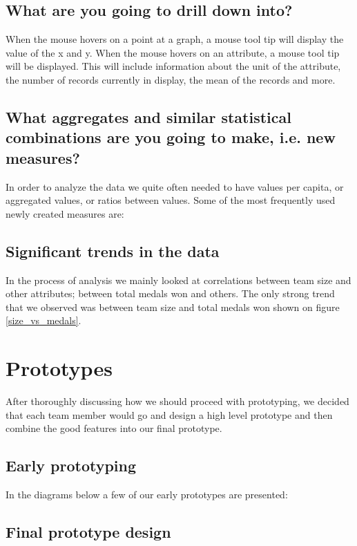 \documentclass[a4paper]{article}
\begin{document}
\subsection{What are you going to drill down into?}

When the mouse hovers on a point at a graph, a mouse tool tip will display the value of the x and y. When the mouse hovers on an attribute, a mouse tool tip will be displayed. This will include information about the unit of the attribute, the number of records currently in display, the mean of the records and more.

\subsection{What aggregates and similar statistical combinations are you going to make, i.e. new measures?}

In order to analyze the data we quite often needed to have values per capita, or aggregated values, or ratios between values. Some of the most frequently used newly created measures are: 

\subsection{Significant trends in the data}

In the process of analysis we mainly looked at correlations between team size and other attributes; between total medals won and others. The only strong trend that we observed was between team size and total medals won shown on figure \ref{size_vs_medals}.

\section{Prototypes}

After thoroughly discussing how we should proceed with prototyping, we decided that each team member would go and design a high level prototype and then combine the good features into our final prototype.

\subsection{Early prototyping}

In the diagrams below a few of our early prototypes are presented:


\subsection{Final prototype design}
\end{document}
